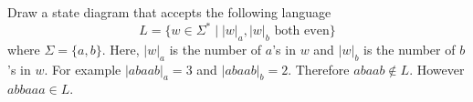   Draw a state diagram that accepts the following language
  \[
  L = \{w \in \Sigma^* \mid |w|_a, |w|_b \text{ both even}\}
  \]
  where $\Sigma = \{a, b\}$.
  Here, 
  $|w|_a$ is the number of $a$'s in $w$
  and
  $|w|_b$ is the number of $b$'s in $w$.
  For example $|abaab|_a = 3$ and $|abaab|_b = 2$.
  Therefore $abaab \not\in L$.
  However $abbaaa \in L$.
